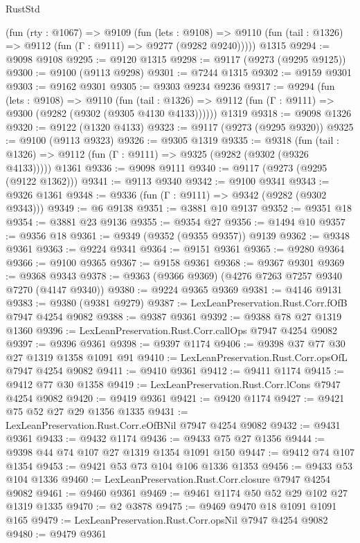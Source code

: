 \begin{lexlean}{RustStd}
\begin{coremodule}
    (fun (rty : @1067) =>
    @9109
      (fun (lets : @9108) =>
      @9110 (fun (tail : @1326) => @9112 (fun (Γ : @9111) => @9277 (@9282 @9240)))))
    @1315
@9294 := @9098 @9108
@9295 := @9120 @1315
@9298 := @9117 (@9273 (@9295 @9125))
@9300 := @9100 (@9113 @9298)
@9301 := @7244 @1315
@9302 := @9159 @9301
@9303 := @9162 @9301
@9305 := @9303 @9234 @9236
@9317 := @9294
    (fun (lets : @9108) =>
    @9110
      (fun (tail : @1326) => @9112 (fun (Γ : @9111) => @9300 (@9282 (@9302 (@9305 @4130 @4133))))))
    @1319
@9318 := @9098 @1326
@9320 := @9122 (@1320 @4133)
@9323 := @9117 (@9273 (@9295 @9320))
@9325 := @9100 (@9113 @9323)
@9326 := @9305 @1319
@9335 := @9318
    (fun (tail : @1326) => @9112 (fun (Γ : @9111) => @9325 (@9282 (@9302 (@9326 @4133)))))
    @1361
@9336 := @9098 @9111
@9340 := @9117 (@9273 (@9295 (@9122 @1362)))
@9341 := @9113 @9340
@9342 := @9100 @9341
@9343 := @9326 @1361
@9348 := @9336 (fun (Γ : @9111) => @9342 (@9282 (@9302 @9343)))
@9349 := @6 @9138
@9351 := @3881 @10 @9137
@9352 := @9351 @18
@9354 := @3881 @23 @9136
@9355 := @9354 @27
@9356 := @1494 @10
@9357 := @9356 @18
@9361 := @9349 (@9352 (@9355 @9357)) @9139
@9362 := @9348 @9361
@9363 := @9224 @9341
@9364 := @9151 @9361
@9365 := @9280 @9364
@9366 := @9100 @9365
@9367 := @9158 @9361
@9368 := @9367 @9301
@9369 := @9368 @9343
@9378 := @9363 (@9366 @9369) (@4276 @7263 @7257 @9340 @7270 (@4147 @9340))
@9380 := @9224 @9365 @9369
@9381 := @4146 @9131
@9383 := @9380 (@9381 @9279)
@9387 := LexLeanPreservation.Rust.Corr.fOfB @7947 @4254 @9082
@9388 := @9387 @9361
@9392 := @9388 @78 @27 @1319 @1360
@9396 := LexLeanPreservation.Rust.Corr.callOps @7947 @4254 @9082
@9397 := @9396 @9361
@9398 := @9397 @1174
@9406 := @9398 @37 @77 @30 @27 @1319 @1358 @1091 @91
@9410 := LexLeanPreservation.Rust.Corr.opsOfL @7947 @4254 @9082
@9411 := @9410 @9361
@9412 := @9411 @1174
@9415 := @9412 @77 @30 @1358
@9419 := LexLeanPreservation.Rust.Corr.lCons @7947 @4254 @9082
@9420 := @9419 @9361
@9421 := @9420 @1174
@9427 := @9421 @75 @52 @27 @29 @1356 @1335
@9431 := LexLeanPreservation.Rust.Corr.eOfBNil @7947 @4254 @9082
@9432 := @9431 @9361
@9433 := @9432 @1174
@9436 := @9433 @75 @27 @1356
@9444 := @9398 @44 @74 @107 @27 @1319 @1354 @1091 @150
@9447 := @9412 @74 @107 @1354
@9453 := @9421 @53 @73 @104 @106 @1336 @1353
@9456 := @9433 @53 @104 @1336
@9460 := LexLeanPreservation.Rust.Corr.closure @7947 @4254 @9082
@9461 := @9460 @9361
@9469 := @9461 @1174 @50 @52 @29 @102 @27 @1319 @1335
@9470 := @2 @3878
@9475 := @9469 @9470 @18 @1091 @1091 @165
@9479 := LexLeanPreservation.Rust.Corr.opsNil @7947 @4254 @9082
@9480 := @9479 @9361

\end{coremodule}
\end{lexlean}
